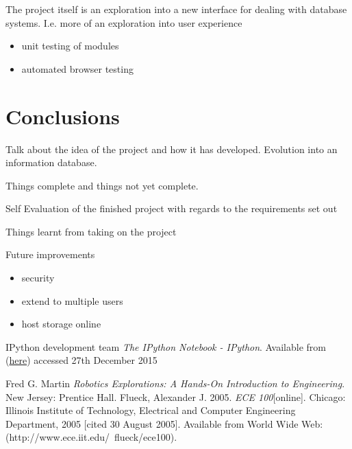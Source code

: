 \documentclass[a4paper, 11pt]{article}
\begin{document}
The project itself is an exploration into a new interface for dealing with
database systems. I.e. more of an exploration into user experience

\begin{itemize}
  \item{unit testing of modules}
  \item{automated browser testing}
\end{itemize}

\section{Conclusions}

Talk about the idea of the project and how it has developed.
Evolution into an information database.

Things complete and things not yet complete.

Self Evaluation of the finished project with regards to the requirements set out

Things learnt from taking on the project

Future improvements

\begin{itemize}
  \item{security}
  \item{extend to multiple users}
  \item{host storage online}
\end{itemize}

\begin{thebibliography}{9}

   IPython development team \emph{The IPython Notebook -
  IPython}. Available from
  (\href{http://ipython.org/notebook.html}{here})
  accessed 27th December 2015

\ifx
   Fred G. Martin \emph{Robotics Explorations: A Hands-On Introduction to Engineering}. New Jersey: Prentice Hall.
    Flueck, Alexander J. 2005. \emph{ECE 100}[online]. Chicago: Illinois Institute of Technology, Electrical and Computer Engineering Department, 2005 [cited 30
  August 2005]. Available from World Wide Web: (http://www.ece.iit.edu/~flueck/ece100).
\fi

\end{thebibliography}
\end{document}
